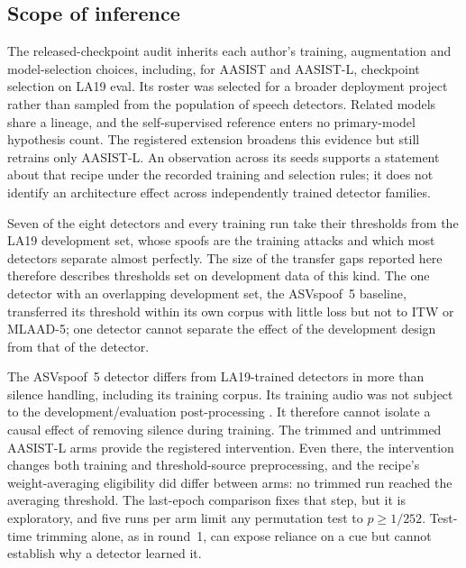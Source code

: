 \subsection{Scope of inference}
The released-checkpoint audit inherits each author's training, augmentation and model-selection choices, including, for
AASIST and AASIST-L, checkpoint selection on LA19 eval. Its roster was selected for a broader deployment project rather
than sampled from the population of speech detectors. Related models share a lineage, and the self-supervised reference
enters no primary-model hypothesis count. The registered extension broadens this evidence but still retrains only
AASIST-L. An observation across its seeds supports a statement about that recipe under the recorded training and
selection rules; it does not identify an architecture effect across independently trained detector families.

Seven of the eight detectors and every training run take their thresholds from the LA19 development set, whose spoofs
are the training attacks and which most detectors separate almost perfectly. The size of the transfer gaps reported here
therefore describes thresholds set on development data of this kind. The one detector with an overlapping development
set, the ASVspoof~5 baseline, transferred its threshold within its own corpus with little loss but not to ITW or
MLAAD-5; one detector cannot separate the effect of the development design from that of the detector.

The ASVspoof~5 detector differs from LA19-trained detectors in more than silence handling, including its training
corpus. Its training audio was not subject to the development/evaluation post-processing
\citep{wang25_asvspoof5_db}. It therefore cannot isolate a causal effect of removing silence during training. The
trimmed and untrimmed AASIST-L arms provide the registered intervention. Even there, the intervention changes both
training and threshold-source preprocessing, and the recipe's weight-averaging eligibility did differ between arms: no
trimmed run reached the averaging threshold. The last-epoch comparison fixes that step, but it is exploratory, and five
runs per arm limit any permutation test to \(p\geq1/252\). Test-time trimming alone, as in round~1, can expose reliance
on a cue but cannot establish why a detector learned it.

